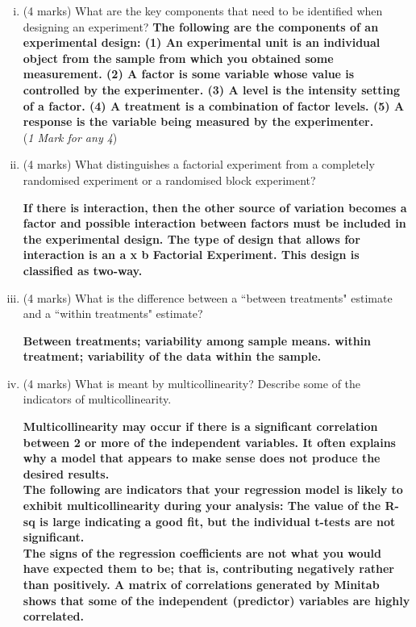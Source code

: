 \documentclass[a4paper,12pt]{article}
\begin{document}
\begin{enumerate}[(i)]
	\item (4 marks) What are the key components that need to be identified when designing an
	experiment?
	\textbf{The following are the components of an experimental design:
	(1) An experimental unit is an individual object from the sample from
		which you obtained some measurement.
	(2) A factor is some variable whose value is controlled by the experimenter.
	(3) A level is the intensity setting of a factor.
	(4) A treatment is a combination of factor levels.
	(5) A response is the variable being measured by the experimenter.}\\
(\textit{1 Mark for any 4})
	
	\item (4 marks) What distinguishes a factorial experiment from a completely randomised
	experiment or a randomised block experiment?
	
	\textbf{ If there is interaction, then the other source of variation becomes a factor and
		possible interaction between factors must be included in the experimental
		design. The type of design that allows for interaction is an a x b Factorial
		Experiment. This design is classified as two-way.}
	
	
	\item (4 marks) What is the difference between a ``between treatments" estimate and a ``within
	treatments" estimate?
	
	\textbf{Between treatments; variability among sample means. within treatment;
		variability of the data within the sample.}
	
	
	\item  (4 marks) What is meant by multicollinearity? Describe some of the indicators of multicollinearity.
	
	\textbf{Multicollinearity may occur if there is a significant correlation between 2 or more of
		the independent variables. It often explains why a model that appears to make sense
		does not produce the desired results. }\\
	\textbf{The following are indicators that your regression
		model is likely to exhibit multicollinearity during your analysis:
		The value of the R-sq is large indicating a good fit, but the individual t-tests are
		not significant.}\\
	\textbf{The signs of the regression coefficients are not what you would have expected
		them to be; that is, contributing negatively rather than positively.
		A matrix of correlations generated by Minitab shows that some of the
		independent (predictor) variables are highly correlated.}
	

\end{enumerate}
\end{document}
